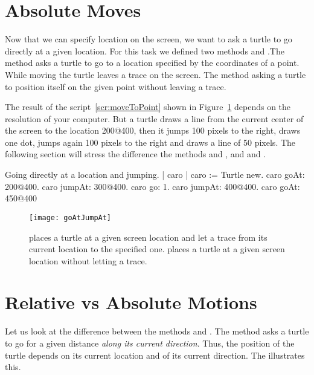 \section{Absolute Moves}
Now that we can specify location on the screen, we want to ask a turtle to go directly at a given location. For this task we defined two 
methods \lgoat{} and  \ljumpat{}.The method  asks a turtle to go to a
location specified by the coordinates of a point. While moving the
turtle leaves a trace on the screen. The method \ljumpat asking a turtle to position
itself on the given point without leaving a trace. 

The result of the script~\ref{scr:moveToPoint} shown in Figure~\ref{fig:goatjump} depends on the resolution of your computer. But a turtle draws a line from the current center of the screen to the location 200@400, then it jumps 100 pixels to the right, draws one dot, jumps again 100 pixels to the right and draws a line of 50 pixels. The following section will stress the difference the methods  and \lgoat, and  and \ljumpat.

\begin{scriptwithtitle}{Going directly at a location and jumping.}\label{scr:moveToPoint}
| caro  |
caro := Turtle new.
caro goAt: 200@400.
caro jumpAt: 300@400.
caro go: 1.
caro jumpAt: 400@400.
caro goAt: 450@400
\end{scriptwithtitle}

\begin{figure}
\begin{center}
\texttt{[image: goAtJumpAt]}
\caption{\lgoat places a turtle at a given screen location and let a trace from 
its current location to the specified one. \ljumpat places a turtle at a given 
screen location without  letting a trace. \label{fig:goatjump}}
\end{center}
\end{figure}




\section{Relative vs Absolute Motions}
Let us look at the difference between the methods   and \lgoat.
The method \lgo asks a turtle to go for a given distance \emph{along its current direction}. Thus, the position of
the turtle depends on its current location and of its current
direction. The  illustrates this.

